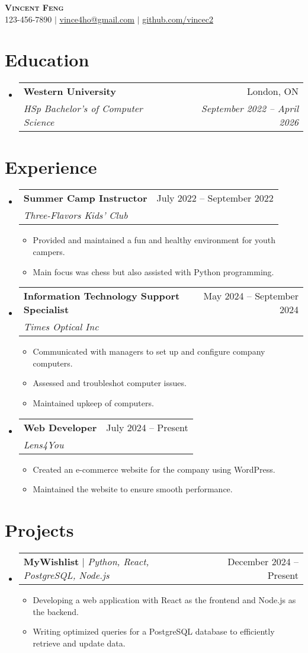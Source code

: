 \documentclass[letterpaper,11pt]{article}
\makeatletter
\newcommand{\resumeItem}[1]{
  \item\small{
    {#1 \vspace{-2pt}}
  }
}
\newcommand{\resumeSubheading}[4]{
  \vspace{-2pt}\item
    \begin{tabular*}{0.97\textwidth}[t]{l@{\extracolsep{\fill}}r}
      \textbf{#1} & #2 \\
      \textit{\small#3} & \textit{\small #4} \\
    \end{tabular*}\vspace{-7pt}
}
\newcommand{\resumeProjectHeading}[2]{
    \item
    \begin{tabular*}{0.97\textwidth}{l@{\extracolsep{\fill}}r}
      \small#1 & #2 \\
    \end{tabular*}\vspace{-7pt}
}
\newcommand{\resumeSubHeadingListStart}{\begin{itemize}[leftmargin=0.15in, label={}]}
\newcommand{\resumeSubHeadingListEnd}{\end{itemize}}
\newcommand{\resumeItemListStart}{\begin{itemize}}
\newcommand{\resumeItemListEnd}{\end{itemize}\vspace{-5pt}}
\makeatother
\begin{document}
\begin{center}
    \textbf{\Huge \scshape Vincent Feng} \\ \vspace{1pt}
    \small 123-456-7890 $|$ \href{mailto:x@x.com}{\underline{vince4ho@gmail.com}} $|$ 
    \href{https://github.com/...}{\underline{github.com/vincec2}}
\end{center}

\section{Education}
  \resumeSubHeadingListStart
    \resumeSubheading
      {Western University}{London, ON}
      {HSp Bachelor's of Computer Science}{September 2022 -- April 2026}
  \resumeSubHeadingListEnd

\section{Experience}
  \resumeSubHeadingListStart

    \resumeSubheading
      {Summer Camp Instructor}{July 2022 -- September 2022}
      {Three-Flavors Kids' Club}{}
      \resumeItemListStart
        \resumeItem{Provided and maintained a fun and healthy environment for youth campers.}
        \resumeItem{Main focus was chess but also assisted with Python programming.}
      \resumeItemListEnd

    \resumeSubheading
      {Information Technology Support Specialist}{May 2024 -- September 2024}
      {Times Optical Inc}{}
      \resumeItemListStart
        \resumeItem{Communicated with managers to set up and configure company computers.}
        \resumeItem{Assessed and troubleshot computer issues.}
        \resumeItem{Maintained upkeep of computers.}
    \resumeItemListEnd

    \resumeSubheading
      {Web Developer}{July 2024 -- Present}
      {Lens4You}{}
      \resumeItemListStart
        \resumeItem{Created an e-commerce website for the company using WordPress.}
        \resumeItem{Maintained the website to ensure smooth performance.}
      \resumeItemListEnd

  \resumeSubHeadingListEnd

\section{Projects}
    \resumeSubHeadingListStart
      \resumeProjectHeading
          {\textbf{MyWishlist} $|$ \emph{Python, React, PostgreSQL, Node.js}}{December 2024 -- Present}
          \resumeItemListStart
            \resumeItem{Developing a web application with React as the frontend and Node.js as the backend.}
            \resumeItem{Writing optimized queries for a PostgreSQL database to efficiently retrieve and update data.}
          \resumeItemListEnd
    \resumeSubHeadingListEnd
\end{document}
